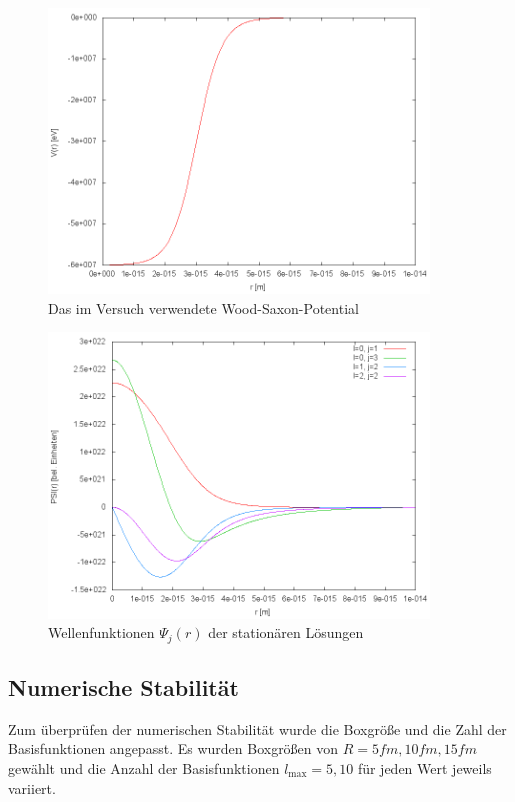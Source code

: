 \begin{figure}[htbp]
  \centering
  \includegraphics[width=0.9\textwidth]{img/wood-saxon}
  \caption{Das im Versuch verwendete Wood-Saxon-Potential}
  \label{fig:wood-saxon}
\end{figure}

\begin{figure}
  \centering
  \includegraphics[width=0.9\textwidth]{img/psi}
  \caption{Wellenfunktionen $\varPsi_j(r)$ der stationären Lösungen}
  \label{fig:wave-functions}
\end{figure}

\subsection{Numerische Stabilität}
\label{sec:numerische-stabi}

Zum überprüfen der numerischen Stabilität wurde die Boxgröße und die
Zahl der Basisfunktionen angepasst. Es wurden Boxgrößen von $R =
\unit{5}{fm}, \unit{10}{fm}, \unit{15}{fm}$ gewählt und die Anzahl der
Basisfunktionen $l_{\max} = 5,10$ für jeden Wert jeweils variiert.

